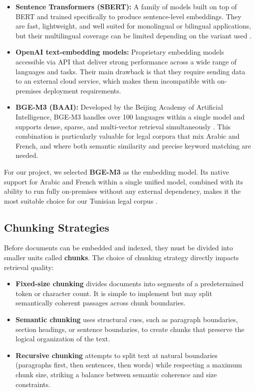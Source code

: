 \begin{itemize}
    \item \textbf{Sentence Transformers (SBERT):} A family of models built
    on top of \ac{BERT} and trained specifically to produce sentence-level
    embeddings. They are fast, lightweight, and well suited for monolingual
    or bilingual applications, but their multilingual coverage can be
    limited depending on the variant used \cite{reimers2019sentencebert}.

    \item \textbf{OpenAI text-embedding models:} Proprietary embedding
    models accessible via \ac{API} that deliver strong performance across
    a wide range of languages and tasks. Their main drawback is that they
    require sending data to an external cloud service, which makes them
    incompatible with on-premises deployment requirements.

    \item \textbf{BGE-M3 (BAAI):} Developed by the Beijing Academy of
    Artificial Intelligence, BGE-M3 handles over 100 languages within a
    single model and supports dense, sparse, and multi-vector retrieval 
    simultaneously \cite{chen2024bgem3}. This combination is particularly
    valuable for legal corpora that mix Arabic and French, and where both
    semantic similarity and precise keyword matching are needed.
\end{itemize}

For our project, we selected \textbf{BGE-M3} as the embedding model. Its
native support for Arabic and French within a single unified model, combined
with its ability to run fully on-premises without any external dependency,
makes it the most suitable choice for our Tunisian legal corpus
\cite{chen2024bgem3}.

\subsection{Chunking Strategies}

Before documents can be embedded and indexed, they must be divided into smaller
units called \textbf{chunks}. The choice of chunking strategy directly impacts
retrieval quality:

\begin{itemize}
    \item \textbf{Fixed-size chunking} divides documents into segments of a
    predetermined token or character count. It is simple to implement but
    may split semantically coherent passages across chunk boundaries.

    \item \textbf{Semantic chunking} uses structural cues, such as paragraph
    boundaries, section headings, or sentence boundaries, to create chunks
    that preserve the logical organization of the text.

    \item \textbf{Recursive chunking} attempts to split text at natural
    boundaries (paragraphs first, then sentences, then words) while
    respecting a maximum chunk size, striking a balance between semantic
    coherence and size constraints.
\end{itemize}

